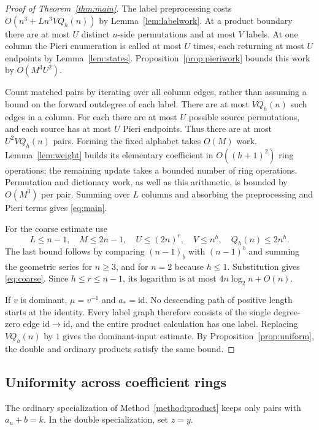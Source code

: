 \documentclass{amsart}
\theoremstyle{definition}
\theoremstyle{remark}
\numberwithin{equation}{section}
\newcommand{\id}{\mathrm{id}}
\newcommand{\fall}[2]{(#1)_{\underline{#2}}}
\begin{document}
\begin{proof}[Proof of Theorem~\ref{thm:main}]
The label preprocessing costs
$O(n^3+L n^3 VQ_h(n))$ by Lemma~\ref{lem:labelwork}.
At a product boundary there are at most $U$ distinct $u$-side
permutations and at most $V$ labels.
At one column the Pieri enumeration is called at most $U$ times,
each returning at most $U$ endpoints by Lemma~\ref{lem:states}.
Proposition~\ref{prop:pieriwork} bounds this work by $O(M^3U^2)$.

Count matched pairs by iterating over all column edges, rather than
assuming a bound on the forward outdegree of each label.
There are at most $VQ_h(n)$ such edges in a column.
For each there are at most $U$ possible source permutations,
and each source has at most $U$ Pieri endpoints.
Thus there are at most $U^2VQ_h(n)$ pairs.
Forming the fixed alphabet takes $O(M)$ work.
Lemma~\ref{lem:weight} builds its elementary coefficient in
$O((h+1)^2)$ ring operations; the remaining update takes a bounded
number of ring operations.
Permutation and dictionary work, as well as this arithmetic, is
bounded by $O(M^3)$ per pair.
Summing over $L$ columns and absorbing the preprocessing and
Pieri terms gives \eqref{eq:main}.

For the coarse estimate use
\[
 L\leq n-1,\quad M\leq2n-1,\quad U\leq(2n)^r,\quad
 V\leq n^h,\quad Q_h(n)\leq2n^h .
 \]
The last bound follows by comparing $\fall{n-1}{b}$ with $(n-1)^b$
and summing the geometric series for $n\geq3$, and
for $n=2$ because $h\leq1$.
Substitution gives \eqref{eq:coarse}.
Since $h\leq r\leq n-1$, its logarithm is at most
$4n\log_2 n+O(n)$.

If $v$ is dominant, $\mu=v^{-1}$ and $a_*=\id$.
No descending path of positive length starts at the identity.
Every label graph therefore consists of the single degree-zero edge
$\id\to\id$, and the entire product calculation has one label.
Replacing $VQ_h(n)$ by $1$ gives the dominant-input estimate.
By Proposition~\ref{prop:uniform}, the double and ordinary products
satisfy the same bound.
\end{proof}

\subsection{Uniformity across coefficient rings}

The ordinary specialization of Method~\ref{method:product} keeps only
pairs with $a_u+b=k$. In the double specialization, set $z=y$.
\end{document}
